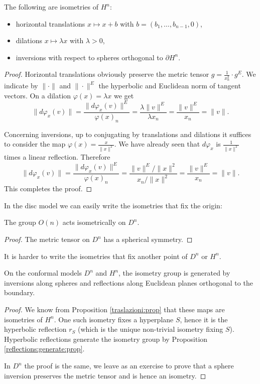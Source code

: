 \begin{prop} \label{traslazioni:prop}
The following are isometries of $H^n$:
\begin{itemize}
\item horizontal translations $x \mapsto x+b$ with $b=(b_1,\ldots, b_{n-1}, 0)$,
\item dilations $x \mapsto \lambda x$ with $\lambda>0$,
\item inversions with respect to spheres orthogonal to $\partial H^n$.
\end{itemize}
\end{prop}
\begin{proof}
Horizontal translations obviously preserve the metric tensor $g= \frac 1{x_n^2}\cdot g^E$. 
We indicate by $\|\cdot \|$ and $\|\cdot\|^E$ the hyperbolic and Euclidean norm of tangent vectors. On a dilation $\varphi( x)= \lambda x$ we get 
$$\|d\varphi_x(v)\| = \frac{\|d\varphi_x(v)\|^E}{\varphi(x)_n} =
\frac{\lambda \|v\|^E}{\lambda x_n} = 
\frac{\|v\|^E}{x_n} = \|v\|.
$$

Concerning inversions, up to conjugating by translations and dilations it suffices to consider the map $\varphi(x) = \frac{x}{\|x\|^2}$. We have already seen that $d\varphi_x$ is $\frac {1}{\|x\|^2}$ times a linear reflection. Therefore
$$\|d\varphi_x(v)\| = \frac{\|d\varphi_x(v)\|^E}{\varphi(x)_n} =
\frac{\|v\|^E/\|x\|^2 }{x_n/\|x\|^2} = 
\frac{\|v\|^E}{x_n} = \|v\|.
$$
This completes the proof.
\end{proof}

In the disc model we can easily write the isometries that fix the origin:

\begin{prop}
The group $O(n)$ acts isometrically on $D^n$.
\end{prop}
\begin{proof}
The metric tensor on $D^n$ has a spherical symmetry.
\end{proof}

It is harder to write the isometries that fix another point of $D^n$ or $H^n$. 

\begin{prop} \label{generate:Hn:prop}
On the conformal models $D^n$ and $H^n$, the isometry group is generated by inversions along spheres and reflections along Euclidean planes orthogonal to the boundary.
\end{prop}
\begin{proof}
We know from Proposition \ref{traslazioni:prop} that these maps are isometries of $H^n$. One such isometry fixes a hyperplane $S$, hence it is the hyperbolic reflection $r_S$ (which is the unique non-trivial isometry fixing $S$). Hyperbolic reflections generate the isometry group by Proposition \ref{reflections:generate:prop}. 

In $D^n$ the proof is the same, we leave as an exercise to prove that a sphere inversion preserves the metric tensor and is hence an isometry.
\end{proof}

